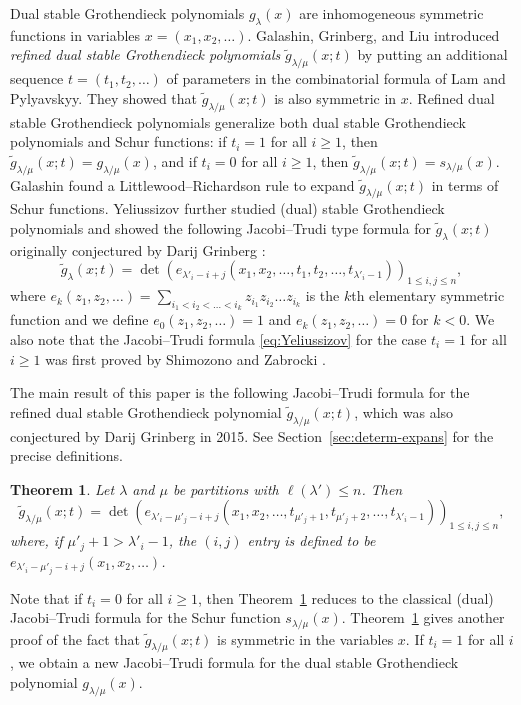 \documentclass{amsart}
\numberwithin{equation}{section}
\newtheorem{thm}{Theorem}[section]
\theoremstyle{definition}
\newcommand\lm{{\lambda/\mu}}
\renewcommand\gg{\widetilde{g}}
\begin{document}
Dual stable Grothendieck polynomials $g_\lambda(x)$ are inhomogeneous symmetric
functions in variables $x=(x_1,x_2,\dots)$. Galashin, Grinberg, and Liu
\cite{GGL2016} introduced \emph{refined dual stable Grothendieck polynomials}
$\gg_{\lm}(x;t)$ by putting an additional sequence $t=(t_1,t_2,\dots)$ of
parameters in the combinatorial formula of Lam and Pylyavskyy. They showed that
$\gg_{\lm}(x;t)$ is also symmetric in $x$. Refined dual stable Grothendieck
polynomials generalize both dual stable Grothendieck polynomials and Schur
functions: if $t_i=1$ for all $i\ge1$, then $\gg_{\lm}(x;t)=g_{\lm}(x)$, and if
$t_i=0$ for all $i\ge1$, then $\gg_{\lm}(x;t)=s_{\lm}(x)$. Galashin
\cite{Galashin2017} found a Littlewood--Richardson rule to expand
$\gg_{\lm}(x;t)$ in terms of Schur functions. Yeliussizov \cite{Yeliussizov2017}
further studied (dual) stable Grothendieck polynomials and showed the following
Jacobi--Trudi type formula for $\gg_{\lambda}(x;t)$ originally conjectured by
Darij Grinberg \cite{Grinberg_conj}:
\begin{equation}
  \label{eq:Yeliussizov}
  \widetilde{g}_{\lambda}(x;t) = \det
  \left( e_{\lambda'_i-i+j}(x_1,x_2,\dots,t_1,t_2,\dots,t_{\lambda'_i-1})
  \right)_{1\le i,j\le n},
\end{equation}
where $e_k(z_1,z_2,\dots)=\sum_{i_1<i_2<\dots<i_k}z_{i_1}z_{i_2}\dots z_{i_k}$
is the $k$th elementary symmetric function and we define $e_0(z_1,z_2,\dots)=1$
and $e_k(z_1,z_2,\dots)=0$ for $k<0$. We also note that the Jacobi--Trudi
formula \eqref{eq:Yeliussizov} for the case $t_i=1$ for all $i\ge1$ was first
proved by Shimozono and Zabrocki \cite{ShimozonoZabrocki}.

The main result of this paper is the following Jacobi--Trudi formula for the
refined dual stable Grothendieck polynomial $\gg_{\lm}(x;t)$, which was also
conjectured by Darij Grinberg \cite[slide 72]{Grinberg_conj} in 2015. See
Section~\ref{sec:determ-expans} for the precise definitions.

\begin{thm}\label{thm:main}
  Let $\lambda$ and $\mu$ be partitions with $\ell(\lambda')\le n$. Then
\[
  \widetilde{g}_{\lambda/\mu}(x;t) = \det
  \left( e_{\lambda'_i-\mu'_j-i+j}
    (x_1,x_2,\dots,t_{\mu'_j+1},t_{\mu'_j+2},\dots,t_{\lambda'_i-1})
  \right)_{1\le i,j\le n},
\]
where, if $\mu'_j+1>\lambda'_i-1$, the $(i,j)$ entry is defined to be
$e_{\lambda'_i-\mu'_j-i+j} (x_1,x_2,\dots)$.
\end{thm}

Note that if $t_i=0$ for all $i\ge1$, then Theorem~\ref{thm:main} reduces to the
classical (dual) Jacobi--Trudi formula for the Schur function $s_\lm(x)$.
Theorem~\ref{thm:main} gives another proof of the fact that $\gg_{\lm}(x;t)$ is
symmetric in the variables $x$. If $t_i=1$ for all $i$, we obtain a new
Jacobi--Trudi formula for the dual stable Grothendieck polynomial $g_\lm(x)$.
\end{document}
